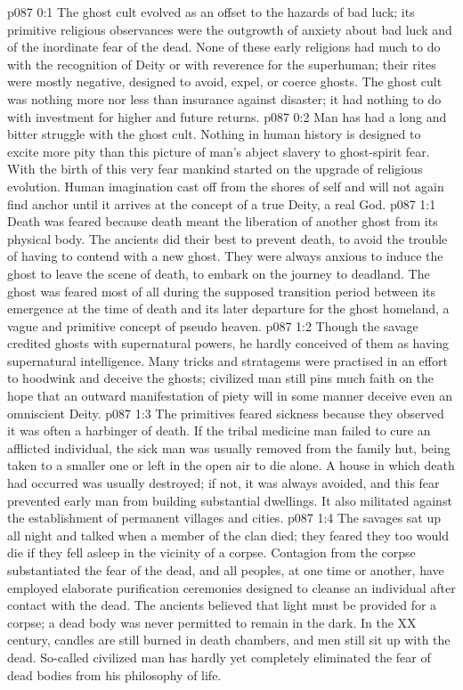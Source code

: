 \author{Brilliant Evening Star}
\vs p087 0:1 The ghost cult evolved as an offset to the hazards of bad luck; its primitive religious observances were the outgrowth of anxiety about bad luck and of the inordinate fear of the dead. None of these early religions had much to do with the recognition of Deity or with reverence for the superhuman; their rites were mostly negative, designed to avoid, expel, or coerce ghosts. The ghost cult was nothing more nor less than insurance against disaster; it had nothing to do with investment for higher and future returns.
\vs p087 0:2 Man has had a long and bitter struggle with the ghost cult. Nothing in human history is designed to excite more pity than this picture of man’s abject slavery to ghost\hyp{}spirit fear. With the birth of this very fear mankind started on the upgrade of religious evolution. Human imagination cast off from the shores of self and will not again find anchor until it arrives at the concept of a true Deity, a real God.
\vs p087 1:1 Death was feared because death meant the liberation of another ghost from its physical body. The ancients did their best to prevent death, to avoid the trouble of having to contend with a new ghost. They were always anxious to induce the ghost to leave the scene of death, to embark on the journey to deadland. The ghost was feared most of all during the supposed transition period between its emergence at the time of death and its later departure for the ghost homeland, a vague and primitive concept of pseudo heaven.
\vs p087 1:2 Though the savage credited ghosts with supernatural powers, he hardly conceived of them as having supernatural intelligence. Many tricks and stratagems were practised in an effort to hoodwink and deceive the ghosts; civilized man still pins much faith on the hope that an outward manifestation of piety will in some manner deceive even an omniscient Deity.
\vs p087 1:3 The primitives feared sickness because they observed it was often a harbinger of death. If the tribal medicine man failed to cure an afflicted individual, the sick man was usually removed from the family hut, being taken to a smaller one or left in the open air to die alone. A house in which death had occurred was usually destroyed; if not, it was always avoided, and this fear prevented early man from building substantial dwellings. It also militated against the establishment of permanent villages and cities.
\vs p087 1:4 The savages sat up all night and talked when a member of the clan died; they feared they too would die if they fell asleep in the vicinity of a corpse. Contagion from the corpse substantiated the fear of the dead, and all peoples, at one time or another, have employed elaborate purification ceremonies designed to cleanse an individual after contact with the dead. The ancients believed that light must be provided for a corpse; a dead body was never permitted to remain in the dark. In the XX century, candles are still burned in death chambers, and men still sit up with the dead. So\hyp{}called civilized man has hardly yet completely eliminated the fear of dead bodies from his philosophy of life.
